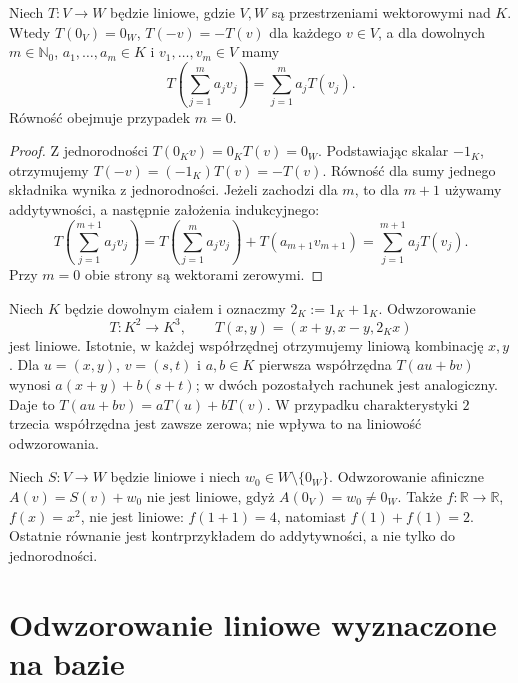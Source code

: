 \begin{lemat}
\label{lem:lin3-podstawowe}
Niech \(T\colon V\to W\) będzie liniowe,
gdzie \(V,W\) są przestrzeniami wektorowymi nad \(K\).
Wtedy \(T(0_V)=0_W\), \(T(-v)=-T(v)\) dla
każdego \(v\in V\), a dla dowolnych
\(m\in\mathbb N_0\), \(a_1,\ldots,a_m\in K\)
i \(v_1,\ldots,v_m\in V\) mamy
\[
 T\left(\sum_{j=1}^m a_jv_j\right)
   =\sum_{j=1}^m a_jT(v_j).
\]
Równość obejmuje przypadek \(m=0\).
\end{lemat}
\begin{proof}
Z jednorodności \(T(0_Kv)=0_KT(v)=0_W\).
Podstawiając skalar \(-1_K\), otrzymujemy
\(T(-v)=(-1_K)T(v)=-T(v)\).
Równość dla sumy jednego składnika wynika
z jednorodności. Jeżeli zachodzi dla \(m\),
to dla \(m+1\) używamy addytywności,
a następnie założenia indukcyjnego:
\[
 T\left(\sum_{j=1}^{m+1}a_jv_j\right)
 =T\left(\sum_{j=1}^{m}a_jv_j\right)
   +T(a_{m+1}v_{m+1})
 =\sum_{j=1}^{m+1}a_jT(v_j).
\]
Przy \(m=0\) obie strony są wektorami zerowymi.
\end{proof}

\begin{przyklad}
\label{prz:lin3-wspolrzedne}
Niech \(K\) będzie dowolnym ciałem i oznaczmy
\(2_K:=1_K+1_K\).
Odwzorowanie
\[
 T\colon K^2\longrightarrow K^3,\qquad
 T(x,y)=(x+y,x-y,2_Kx)
\]
jest liniowe. Istotnie, w każdej współrzędnej
otrzymujemy liniową kombinację \(x,y\).
Dla \(u=(x,y)\), \(v=(s,t)\) i \(a,b\in K\)
pierwsza współrzędna \(T(au+bv)\) wynosi
\(a(x+y)+b(s+t)\); w dwóch pozostałych
rachunek jest analogiczny. Daje to
\(T(au+bv)=aT(u)+bT(v)\).
W przypadku charakterystyki \(2\)
trzecia współrzędna jest zawsze zerowa;
nie wpływa to na liniowość odwzorowania.
\end{przyklad}

\begin{przyklad}
\label{prz:lin3-nieliniowe}
Niech \(S\colon V\to W\) będzie liniowe
i niech \(w_0\in W\setminus\{0_W\}\).
Odwzorowanie afiniczne \(A(v)=S(v)+w_0\)
nie jest liniowe, gdyż \(A(0_V)=w_0\neq0_W\).
Także \(f\colon\mathbb R\to\mathbb R\),
\(f(x)=x^2\), nie jest liniowe:
\(f(1+1)=4\), natomiast \(f(1)+f(1)=2\).
Ostatnie równanie jest kontrprzykładem
do addytywności, a nie tylko do jednorodności.
\end{przyklad}

\section{Odwzorowanie liniowe wyznaczone na bazie}
\label{sec:lin3-baza}

